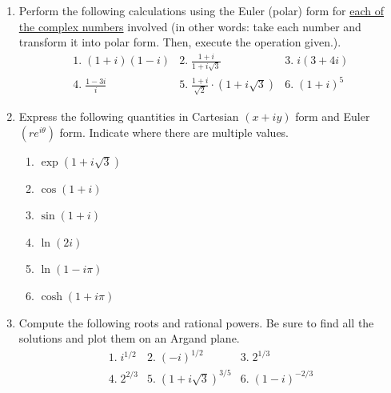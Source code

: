 \documentclass[fleqn]{article}
\begin{document}
\begin{enumerate}
  \item Perform the following calculations using the Euler (polar) form for \underline{each of the complex numbers} involved (in other words: take each number and transform it into polar form. Then, execute the operation given.).
  \[
  \begin{array}{lll}
  1.\;\left( 1+i\right) \left( 1-i\right)  & 2.\;\frac{\textstyle 1+i}{\textstyle 1+i\sqrt{3}} & 3.\;i\left( 3+4i\right)  \\ 
  4.\;\frac{\textstyle 1-3i}{\textstyle i} & 5.\;\frac{\textstyle 1+i}{\textstyle \sqrt{2}}\cdot \left( 1+i\sqrt{3}\right)  & 6.\;\left( 1+i\right) ^{5}
  \end{array}
  \]
  
  \item Express the following quantities in Cartesian $\left(x+iy\right) $ form and Euler $\left( re^{i\theta}\right)$ form. Indicate where there are multiple values.
  
  \begin{enumerate}
    \item $\exp \left( 1+i\sqrt{3}\right)$
    
    \item $\cos \left( 1+i\right)$
    
    \item $\sin \left( 1+i\right)$
    
    \item $\ln (2i)$
    
    \item $\ln \left( 1-i\pi \right)$
    
    \item $\cosh \left( 1+i\pi \right)$
  \end{enumerate}
  
  \item Compute the following roots and rational powers. Be sure to find all the solutions and plot them on an Argand plane. 
  \[
  \begin{array}{lll}
  1.\;i^{1/2} & 2.\;\left( -i\right) ^{1/2} & 3.\;2^{1/3} \\ 
  4.\;2^{2/3} & 5.\;(1+i\sqrt{3})^{3/5} & 6.\;\left( 1-i\right) ^{-2/3}
  \end{array}
  \]
  \end{enumerate}


\pagebreak

\end{document}
